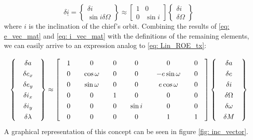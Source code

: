 	\begin{equation}
	\delta \underline{i} =
	\left\{ 
	\begin{array}{c}
	\delta i \\[1.5em]
	\sin i \delta \Omega
	\end{array}
	\right\} \approx
	\left[ 
	\begin{array}{cc}
	1  & 0\\[1.5em]
	0  & \sin i
	\end{array}
	\right]
	\left\{ 
	\begin{array}{c}
	\delta i \\[1.5em]
	\delta \Omega
	\end{array}
	\right\}
	\label{eq: 	i_vec_mat}
	\end{equation}
	\noindent where $i$ is the inclination of the chief's orbit. Combining the results of \eqref{eq: 	e_vec_mat} and \eqref{eq: 	i_vec_mat} with the definitions of the remaining elements, we can easily arrive to an expression analog to \eqref{eq: 	Lin_ROE_tx}:

	\begin{equation}
	\arraycolsep=10pt
	\def\arraystretch{1.3}
	\left\{ \begin{array}{c}
	\delta a \\
	\delta e_x \\
	\delta e_y \\
	\delta i_x \\
	\delta i_y \\
	\delta \lambda
	\end{array}
	\right\} \approx
	\left[ \begin{array}{cccccc}
	1 & 0 & 0 & 0 & 0 & 0 \\
	0 & \cos\omega & 0 & 0 & -e \sin\omega & 0\\
	0 & \sin\omega & 0 & 0 &  e \cos\omega & 0\\
	0 & 0 & 1 & 0 & 0 & 0\\
	0 & 0 & 0 & \sin i & 0 & 0\\
	0 & 0 & 0 & 0 & 1 & 1\\
	\end{array}
	\right]
	\left\{\begin{array}{c}
	\delta a \\
	\delta e \\
	\delta i \\
	\delta \Omega \\
	\delta \omega \\
	\delta M \\
	\end{array}\right\}
	\end{equation} 
	\indent A graphical representation of this concept can be seen in figure \ref{fig: 	inc_vector}.
